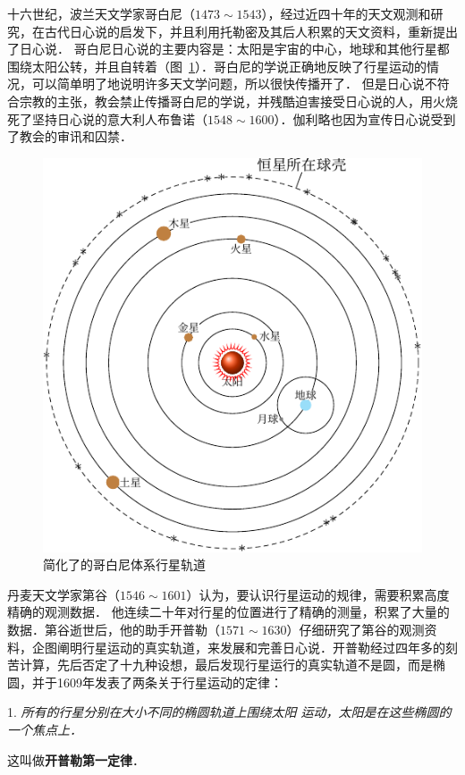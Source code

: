 十六世纪，波兰天文学家哥白尼（$1473 \sim 1543$），经过近四十年的天文观测和研究，在古代日心说的启发下，并且利用托勒密及其后人积累的天文资料，重新提出了日心说．
哥白尼日心说的主要内容是：太阳是宇宙的中心，地球和其他行星都围绕太阳公转，并且自转着（图~\ref{fig_A_5-1}）．哥白尼的学说正确地反映了行星运动的情况，可以简单明了地说明许多天文学问题，所以很快传播开了．
但是日心说不符合宗教的主张，教会禁止传播哥白尼的学说，并残酷迫害接受日心说的人，用火烧死了坚持日心说的意大利人布鲁诺（$1548 \sim 1600$）．伽利略也因为宣传日心说受到了教会的审讯和囚禁．
\begin{figure}[htbp]
	\centering
	\includegraphics{fig/A/5-1.pdf}
	\caption{简化了的哥白尼体系行星轨道}\label{fig_A_5-1}
\end{figure}

丹麦天文学家第谷（$1546 \sim 1601$）认为，要认识行星运动的规律，需要积累高度精确的观测数据．
他连续二十年对行星的位置进行了精确的测量，积累了大量的数据．第谷逝世后，他的助手开普勒（$1571 \sim 1630$）仔细研究了第谷的观测资料，企图阐明行星运动的真实轨道，来发展和完善日心说．开普勒经过四年多的刻苦计算，先后否定了十九种设想，最后发现行星运行的真实轨道不是圆，而是椭圆，并于1609年发表了两条关于行星运动的定律：

1. \textit{所有的行星分别在大小不同的椭圆轨道上围绕太阳
运动，太阳是在这些椭圆的一个焦点上．}

这叫做\textbf{开普勒第一定律}．


